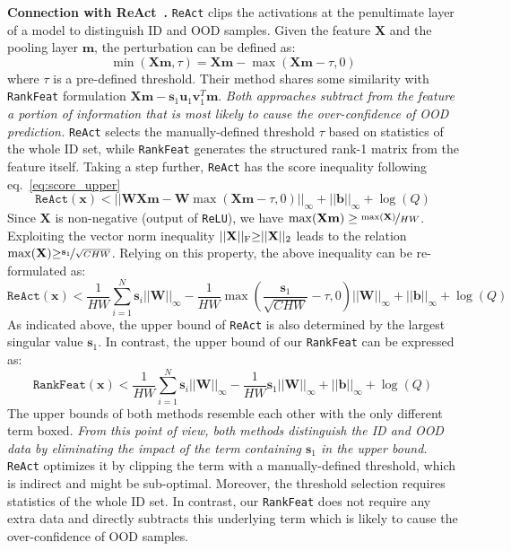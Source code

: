 \noindent \textbf{Connection with ReAct~\cite{sun2021react}.} \texttt{ReAct} clips the activations at the penultimate layer of a model to distinguish ID and OOD samples. Given the feature $\mathbf{X}$ and the pooling layer $\mathbf{m}$, the perturbation can be defined as:
\begin{equation}
     \min(\mathbf{X}\mathbf{m},\tau) = \mathbf{X}\mathbf{m} - \max(\mathbf{X}\mathbf{m}-\tau,0) 
\end{equation}
where $\tau$ is a pre-defined threshold. Their method shares some similarity with \texttt{RankFeat} formulation $\mathbf{X}\mathbf{m}{-}\mathbf{s}_{1}\mathbf{u}_{1}\mathbf{v}_{1}^{T}\mathbf{m}$. \textit{Both approaches subtract from the feature a portion of information that is most likely to cause the over-confidence of OOD prediction.} \texttt{ReAct} selects the manually-defined threshold $\tau$ based on statistics of the whole ID set, while \texttt{RankFeat} generates the structured rank-1 matrix from the feature itself. Taking a step further, \texttt{ReAct} has the score inequality following eq.~\eqref{eq:score_upper}
\begin{equation}
    \texttt{ReAct}(\mathbf{x})<  || \mathbf{W}\mathbf{X}\mathbf{m} - \mathbf{W}\max(\mathbf{X}\mathbf{m}-\tau,0) ||_{\infty} + ||\mathbf{b}||_{\infty} + \log(Q)
\end{equation}
Since $\mathbf{X}$ is non-negative (output of \texttt{ReLU}),
we have $\max(\mathbf{X}\mathbf{m})\geq\nicefrac{\max(\mathbf{X})}{HW}$. Exploiting the vector norm inequality $||\mathbf{X}||_{\rm F}{\geq}||\mathbf{X}||_{2}$ leads to the relation $\max(\mathbf{X}){\geq}\nicefrac{\mathbf{s}_{1}}{\sqrt{CHW}}$. Relying on this property, the above inequality can be re-formulated as:
\begin{equation}
    \texttt{ReAct}(\mathbf{x})< \frac{1}{HW}\sum_{i=1}^{N} \mathbf{s}_{i} ||\mathbf{W}||_{\infty} - \boxed{\frac{1}{HW}{\max( \frac{\mathbf{s}_{1} }{\sqrt{CHW}}-\tau, 0 )||\mathbf{W}||_{\infty}}}+ ||\mathbf{b}||_{\infty} + \log(Q)
\end{equation}
As indicated above, the upper bound of \texttt{ReAct} is also determined by the largest singular value $\mathbf{s}_{1}$. In contrast, the upper bound of our \texttt{RankFeat} can be expressed as:
\begin{equation}
    \texttt{RankFeat}(\mathbf{x})< \frac{1}{HW}\sum_{i=1}^{N} \mathbf{s}_{i} ||\mathbf{W}||_{\infty} - \boxed{\frac{1}{HW}\mathbf{s}_{1} ||\mathbf{W}||_{\infty}} + ||\mathbf{b}||_{\infty} + \log(Q)
\end{equation}
The upper bounds of both methods resemble each other with the only different term boxed. \textit{From this point of view, both methods distinguish the ID and OOD data by eliminating the impact of the term containing $\mathbf{s}_{1}$ in the upper bound.} \texttt{ReAct} optimizes it by clipping the term with a manually-defined threshold, which is indirect and might be sub-optimal. Moreover, the threshold selection requires statistics of the whole ID set. In contrast, our \texttt{RankFeat} does not require any extra data and directly subtracts this underlying term which is likely to cause the over-confidence of OOD samples. 



